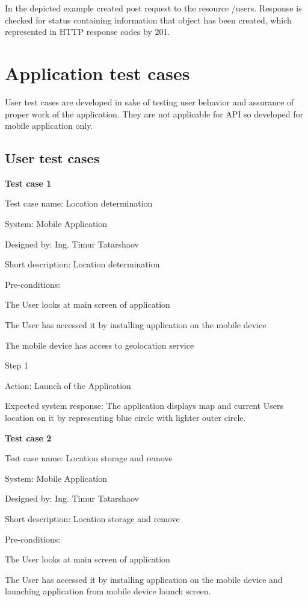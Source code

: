 \documentclass[thesis=M,english]{FITthesis}[2012/10/20]
\begin{document}
In the depicted example created post request to the resource /users. Response is checked for status containing information that object has been created, which represented in HTTP response codes by 201.


\section{Application test cases}


User test cases are developed in sake of  testing user behavior and assurance of proper work of the application. They are not applicable for API so developed for mobile application only.

\subsection{User test cases}

\textbf{Test case 1}

Test case name: Location determination

System: Mobile Application

Designed by: Ing. Timur Tatarshaov

Short description: Location determination

Pre-conditions:

The User looks at main screen of application

The User has accessed it by installing application on the mobile device

The mobile device has access to geolocation service

Step 1

Action: Launch of the Application

Expected system response: The application displays map and current Users location on it by representing blue circle with lighter outer circle.


\textbf{Test case 2}

Test case name: Location storage and remove

System: Mobile Application

Designed by: Ing. Timur Tatarshaov

Short description: Location storage and remove

Pre-conditions:

The User looks at main screen of application

The User has accessed it by installing application on the mobile device and launching application from mobile device launch screen. 
\end{document}
